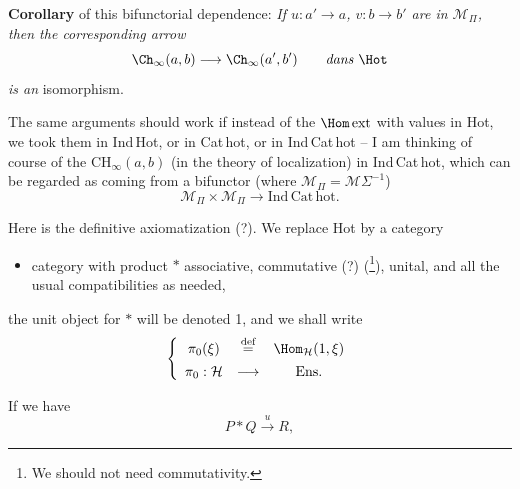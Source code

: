 \textbf{Corollary} of this bifunctorial dependence: \textit{If $u : a' \longrightarrow a$, $v : b \longrightarrow b'$ are in $\mathcal{M}_\Pi$, then the corresponding arrow}
\[
\Ch_\infty(a,b) \longrightarrow \Ch_\infty(a',b') \qquad \textit{dans } \Hot
\]
\textit{is an} isomorphism.

The same arguments should work if instead of the $\Hom\,\mathrm{ext}$ with values in Hot, we took them in Ind\,Hot, or in Cat\,hot, or in Ind\,Cat\,hot -- I am thinking of course of the $\mathrm{CH}_\infty(a,b)$ (in the theory of localization) in Ind\,Cat\,hot, which can be regarded as coming from a bifunctor (where $\mathcal{M}_\Pi = \mathcal{M}\Sigma^{-1}$)
\[
\mathcal{M}_\Pi \times \mathcal{M}_\Pi \longrightarrow \mathrm{Ind}\,\mathrm{Cat}\,\mathrm{hot}.
\]

Here is the definitive axiomatization (?). We replace Hot by a category

\begin{itemize}[label={$\mathcal{H}$,}]
\item category with product $*$ associative, commutative (?) (\footnote{We should not need commutativity.}), unital, and all the usual compatibilities as needed,
\end{itemize}

the unit object for $*$ will be denoted 1, and we shall write
\[
\left\{
\begin{array}{ccc}
\pi_0(\xi) & \overset{\text{def}}{=} & \Hom_{\mathcal{H}}(1,\xi) \\[1ex]
\pi_0 : \mathcal{H} & \longrightarrow & \mathrm{Ens}.
\end{array}
\right.
\]

If we have
\[
P * Q \xrightarrow{\ u\ } R,
\]